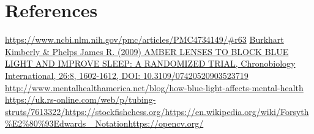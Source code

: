 \documentclass[onecolumn]{IEEEtran}
\begin{document}
\pagebreak
\section{References}
\noindent [1] \href{https://www.ncbi.nlm.nih.gov/pmc/articles/PMC4734149/\#r63}{https://www.ncbi.nlm.nih.gov/pmc/articles/PMC4734149/\#r63} \newline
[2] \href{https://www.tandfonline.com/doi/abs/10.3109/07420520903523719?casa_token=xuj5yeT4EWEAAAAA\%3ADS5C1NhfiI1XBogq05OfmNmXPNALfdGdCkl8oOSUKUsNgLJZQW5dzziJ_a5yXX3H1YCVc57m8jc\&}{Burkhart Kimberly \& Phelps James R. (2009) AMBER LENSES TO BLOCK BLUE LIGHT AND IMPROVE SLEEP: A RANDOMIZED TRIAL, Chronobiology International, 26:8, 1602-1612, DOI: 10.3109/07420520903523719} \newline
[3] \href{http://www.mentalhealthamerica.net/blog/how-blue-light-affects-mental-health}{http://www.mentalhealthamerica.net/blog/how-blue-light-affects-mental-health} \newline
[4]\href{https://uk.rs-online.com/web/p/tubing-struts/7613322/}{https://uk.rs-online.com/web/p/tubing-struts/7613322/}\newline
[5]\href{https://stockfishchess.org/}{https://stockfishchess.org/}\newline
[6]\href{https://en.wikipedia.org/wiki/Forsyth\%E2\%80\%93Edwards\_ Notation}
{https://en.wikipedia.org/wiki/Forsyth\%E2\%80\%93Edwards\_ Notation}\newline
[7]\href{https://opencv.org/}{https://opencv.org/}
\end{document}
